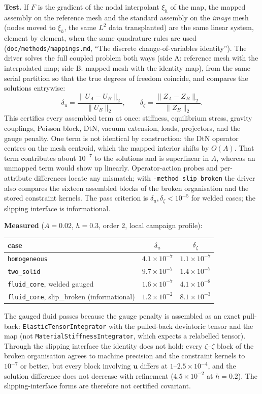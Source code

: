 \documentclass[11pt]{article}
\numberwithin{equation}{section}
\newcommand{\vu}{\mathbf{u}}
\newcommand{\code}[1]{\texttt{#1}}
\begin{document}
\textbf{Test.} If $F$ is the gradient of the nodal interpolant $\xi_h$ of
the map, the mapped assembly on the reference mesh and the standard
assembly on the \emph{image} mesh (nodes moved to $\xi_h$, the same $L^2$
data transplanted) are the same linear system, element by element, when
the same quadrature rules are used (\code{doc/methods/mappings.md}, ``The discrete
change-of-variables identity''). The driver solves the full coupled
problem both ways (side A: reference mesh with the interpolated map; side
B: mapped mesh with the identity map), from the same serial partition so
that the true degrees of freedom coincide, and compares the solutions
entrywise:
\begin{equation}
  \delta_u = \frac{\|U_A-U_B\|_2}{\|U_B\|_2},\qquad
  \delta_\zeta = \frac{\|Z_A-Z_B\|_2}{\|Z_B\|_2}.
\end{equation}
This certifies every assembled term at once: stiffness, equilibrium
stress, gravity couplings, Poisson block, DtN, vacuum extension, loads,
projectors, and the gauge penalty. One term is not identical by
construction: the DtN operator centres on the mesh centroid, which the
mapped interior shifts by $O(A)$. That term contributes about $10^{-7}$ to
the solutions and is superlinear in $A$, whereas an unmapped term would
show up linearly. Operator-action probes and per-attribute differences
locate any mismatch; with \code{-method slip\_broken} the driver also
compares the sixteen assembled blocks of the broken organisation and the
stored constraint kernels. The pass criterion is
$\delta_u,\delta_\zeta<10^{-5}$ for welded cases; the slipping interface
is informational.

\textbf{Measured} ($A=0.02$, $h=0.3$, order 2, local campaign profile):
\begin{center}
\begin{tabular}{@{}lcc@{}}
\toprule
case & $\delta_u$ & $\delta_\zeta$ \\
\midrule
\code{homogeneous} & $4.1\times10^{-7}$ & $1.1\times10^{-7}$ \\
\code{two\_solid} & $9.7\times10^{-7}$ & $1.4\times10^{-7}$ \\
\code{fluid\_core}, welded gauged & $1.6\times10^{-7}$ & $4.1\times10^{-8}$ \\
\code{fluid\_core}, slip\_broken (informational) & $1.2\times10^{-2}$ & $8.1\times10^{-3}$ \\
\bottomrule
\end{tabular}
\end{center}
The gauged fluid passes because the gauge penalty is assembled as an
exact pull-back: \code{ElasticTensorIntegrator} with the pulled-back
deviatoric tensor and the map (not \code{MaterialStiffnessIntegrator},
which expects a relabelled tensor). Through the slipping interface the
identity does not hold: every $\zeta$--$\zeta$ block of the broken
organisation agrees to machine precision and the constraint kernels to
$10^{-7}$ or better, but every block involving $\vu$ differs at
$1$--$2.5\times10^{-4}$, and the solution difference does not decrease
with refinement ($4.5\times10^{-2}$ at $h=0.2$). The slipping-interface
forms are therefore not certified covariant.
\end{document}
